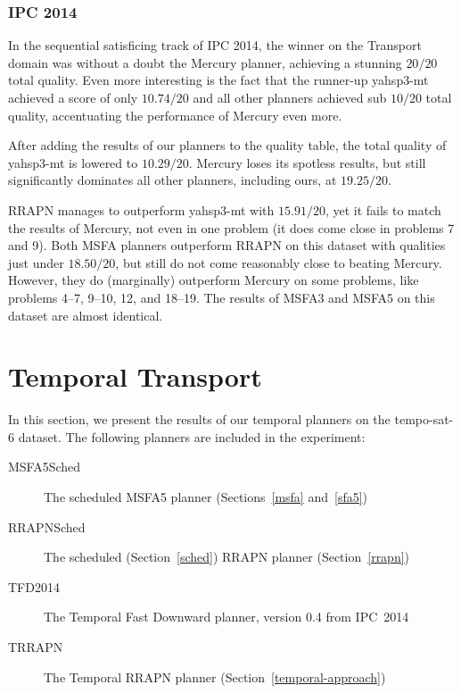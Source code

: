 \subsubsection{IPC 2014}

In the sequential satisficing track of IPC 2014, the winner on the Transport domain
was without a doubt the Mercury planner, achieving
a stunning $20/20$ total quality. Even more interesting is the fact that
the runner-up yahsp3-mt achieved a score of only $10.74/20$
and all other planners achieved sub $10/20$ total quality,
accentuating the performance of Mercury even more.

After adding the results of our planners to the quality table,
the total quality of yahsp3-mt is lowered to $10.29/20$.
Mercury loses its spotless results, but still significantly dominates all
other planners, including ours, at $19.25/20$.

RRAPN manages to outperform yahsp3-mt with $15.91/20$, yet it fails
to match the results of Mercury, not even in one problem (it does come close in problems 7 and 9).
Both MSFA planners outperform RRAPN on this dataset with qualities just under $18.50/20$,
but still do not come reasonably close to beating Mercury.
However, they do (marginally) outperform Mercury on some problems, like
problems 4--7, 9--10, 12, and 18--19.
The results of MSFA3 and MSFA5 on this dataset are almost identical.

















\section{Temporal Transport}

In this section, we present the results of our temporal planners on the tempo-sat-6 dataset. The following planners are included in the experiment:
\begin{description}
\item[MSFA5Sched] The scheduled MSFA5 planner (Sections~\ref{msfa} and~\ref{sfa5})
\item[RRAPNSched] The scheduled (Section~\ref{sched}) RRAPN planner (Section~\ref{rrapn})
\item[TFD2014] The Temporal Fast Downward planner, version 0.4 from IPC~2014 \citep[Preferring Preferred Operators in Temporal Fast Downward]{Vallati2015}
\item[TRRAPN] The Temporal RRAPN planner (Section~\ref{temporal-approach})
\end{description}

